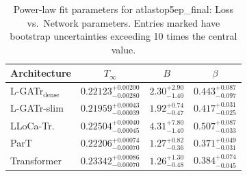 \begin{table}[h]
  \centering
  \begin{tabular}{lccc}
    \toprule
    Architecture & $T_\infty$ & $B$ & $\beta$ \\
    \midrule
    L-GATr$_\mathrm{dense}$ & $0.22123^{+0.00200}_{-0.00280}$ & $2.30^{+2.90}_{-1.40}$ & $0.443^{+0.087}_{-0.097}$ \\
    L-GATr-slim & $0.21959^{+0.00043}_{-0.00039}$ & $1.92^{+0.74}_{-0.47}$ & $0.417^{+0.031}_{-0.025}$ \\
    LLoCa-Tr. & $0.22504^{+0.00040}_{-0.00045}$ & $4.31^{+7.80}_{-1.40}$ & $0.507^{+0.087}_{-0.033}$ \\
    ParT & $0.22206^{+0.00074}_{-0.00070}$ & $1.27^{+0.82}_{-0.36}$ & $0.371^{+0.049}_{-0.031}$ \\
    Transformer & $0.23342^{+0.00086}_{-0.00070}$ & $1.26^{+1.30}_{-0.48}$ & $0.384^{+0.074}_{-0.045}$ \\
    \bottomrule
  \end{tabular}
  \caption{Power-law fit parameters for atlastop5ep\_final: Loss vs.\ Network parameters. Entries marked \textemdash{} have bootstrap uncertainties exceeding 10 times the central value.}
  \label{tab:atlastop5ep_final}
\end{table}
